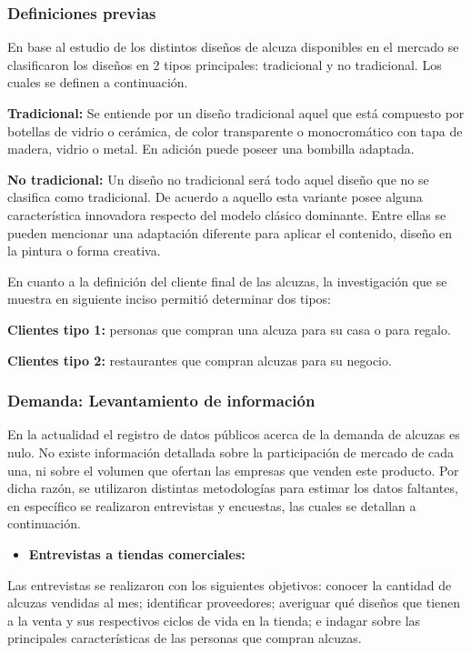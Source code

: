 \subsubsection{Definiciones previas}
En base al estudio de los distintos diseños de alcuza disponibles en el mercado se clasificaron los diseños en 2 tipos principales: tradicional y no tradicional. Los cuales se definen a continuación.

\textbf{Tradicional:} Se entiende por un diseño tradicional aquel que está compuesto por botellas de vidrio o cerámica, de color transparente o monocromático con tapa de madera,  vidrio o metal. En adición puede poseer una bombilla adaptada.

\textbf{No tradicional:} Un diseño no tradicional será todo aquel diseño que no se clasifica como tradicional. De acuerdo a aquello esta variante posee alguna característica innovadora respecto del modelo clásico dominante. Entre ellas se pueden mencionar una adaptación diferente para aplicar el contenido, diseño en la pintura o forma  creativa.

En  cuanto a la definición del cliente final de las alcuzas, la investigación que se muestra en siguiente inciso permitió determinar dos tipos:

\textbf{Clientes tipo 1:} personas que compran una alcuza para su casa o para regalo.

\textbf{Clientes tipo 2:} restaurantes que compran alcuzas para su negocio.

\subsubsection{Demanda: Levantamiento de información}

En la actualidad el registro de datos públicos acerca de la demanda de alcuzas es nulo. No existe información detallada sobre la participación de mercado de cada una, ni sobre el volumen que ofertan las empresas que venden este producto. Por dicha razón, se utilizaron distintas metodologías para estimar los datos faltantes, en específico se realizaron entrevistas y encuestas, las cuales se detallan a continuación.

\begin{itemize}
\item \textbf{Entrevistas a tiendas comerciales:}
\end{itemize}

Las entrevistas se realizaron con los siguientes objetivos: conocer la cantidad de alcuzas vendidas al mes; identificar proveedores; averiguar qué diseños que tienen a la venta y sus respectivos ciclos de vida en la tienda; e indagar sobre las principales características de las personas que compran alcuzas.

